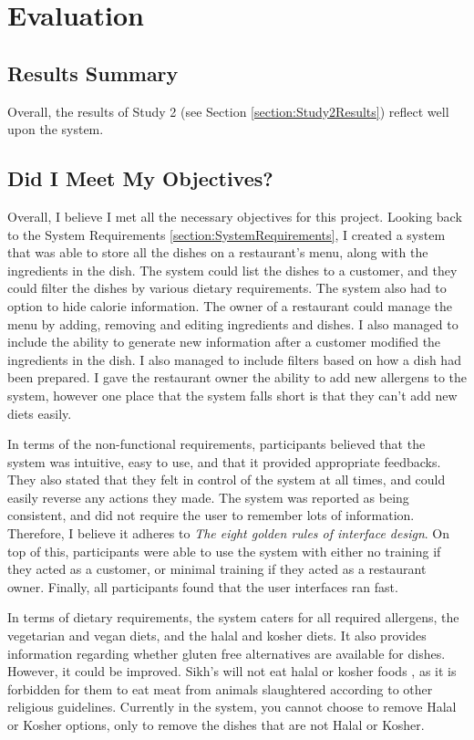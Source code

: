 \chapter{Evaluation}
\label{section:Evaluation}

\section{Results Summary}

Overall, the results of Study 2 (see Section \ref{section:Study2Results}) reflect well upon the system.


\section{Did I Meet My Objectives?}

Overall, I believe I met all the necessary objectives for this project. Looking back to the System Requirements \ref{section:SystemRequirements}, I created a system that was able to store all the dishes on a restaurant's menu, along with the ingredients in the dish. The system could list the dishes to a customer, and they could filter the dishes by various dietary requirements. The system also had to option to hide calorie information. The owner of a restaurant could manage the menu by adding, removing and editing ingredients and dishes. I also managed to include the ability to generate new information after a customer modified the ingredients in the dish. I also managed to include filters based on how a dish had been prepared. I gave the restaurant owner the ability to add new allergens to the system, however one place that the system falls short is that they can't add new diets easily.

In terms of the non-functional requirements, participants believed that the system was intuitive, easy to use, and that it provided appropriate feedbacks. They also stated that they felt in control of the system at all times, and could easily reverse any actions they made. The system was reported as being consistent, and did not require the user to remember lots of information. Therefore, I believe it adheres to \textit{The eight golden rules of interface design}. On top of this, participants were able to use the system with either no training if they acted as a customer, or minimal training if they acted as a restaurant owner. Finally, all participants found that the user interfaces ran fast.

In terms of dietary requirements, the system caters for all required allergens, the vegetarian and vegan diets, and the halal and kosher diets. It also provides information regarding whether gluten free alternatives are available for dishes. However, it could be improved. Sikh's will not eat halal or kosher foods \cite{guidance_on_foods_for_religious_faiths_2009}, as it is forbidden for them to eat meat from animals slaughtered according to other religious guidelines. Currently in the system, you cannot choose to remove Halal or Kosher options, only to remove the dishes that are not Halal or Kosher.

